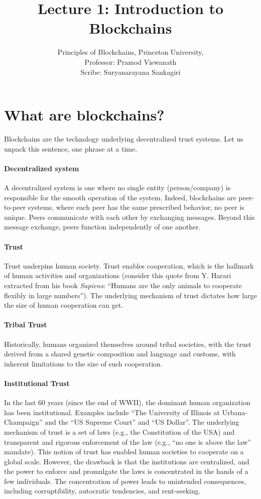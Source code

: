 \documentclass{article}
\title{Lecture 1: Introduction to Blockchains}
\author{Principles of Blockchains, Princeton University,  \\ Professor:  Pramod Viswanath \\ Scribe: Suryanarayana Sankagiri}
\begin{document}
\maketitle
\section*{What are blockchains?}
Blockchains are the technology underlying decentralized trust systems.  Let us unpack this sentence, one phrase at a time.

\paragraph{Decentralized system} A decentralized system is one where no single entity (person/company) is responsible for the smooth operation of the system. Indeed, blockchains are peer-to-peer systems, where each peer has the same prescribed behavior; no peer is unique. Peers communicate with each other by exchanging messages. Beyond this message exchange, peers function independently of one another.

\paragraph{Trust} Trust underpins human society. Trust enables cooperation, which is the hallmark of human activities and organizations (consider this quote from Y. Harari extracted from his book {\em Sapiens}:  “Humans are the only animals to cooperate flexibly in large numbers”). The underlying mechanism of trust dictates how large the size of human cooperation can get. 

\paragraph{Tribal Trust} Historically, humans organized themselves around tribal societies, with the trust derived from a shared genetic composition and language and customs, with inherent limitations to the size of such cooperation. 

\paragraph{Institutional Trust} In the last 60 years (since the end of WWII), the dominant human organization has been institutional. Examples include ``The University of Illinois at Urbana-Champaign” and the ``US Supreme Court” and ``US Dollar”. The underlying mechanism of trust is a set of laws (e.g., the Constitution of the USA) and transparent and rigorous enforcement of the law (e.g., “no one is above the law” mandate). This notion of trust has enabled human societies to cooperate on a global scale. However, the drawback is that the institutions are centralized, and the power to enforce and promulgate the laws is concentrated in the hands of a few individuals. The concentration of power leads to unintended consequences, including corruptibility, autocratic tendencies, and rent-seeking.
\end{document}
